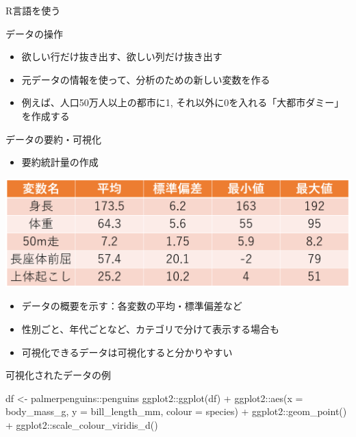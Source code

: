 \documentclass[
  ignorenonframetext,
]{beamer}
\newenvironment{Shaded}{\begin{snugshade}}{\end{snugshade}}
\newcommand{\AttributeTok}[1]{\textcolor[rgb]{0.77,0.63,0.00}{#1}}
\newcommand{\FunctionTok}[1]{\textcolor[rgb]{0.00,0.00,0.00}{#1}}
\newcommand{\NormalTok}[1]{#1}
\newcommand{\OtherTok}[1]{\textcolor[rgb]{0.56,0.35,0.01}{#1}}
\newcommand{\SpecialCharTok}[1]{\textcolor[rgb]{0.00,0.00,0.00}{#1}}
\providecommand{\tightlist}{%
  \setlength{\itemsep}{0pt}\setlength{\parskip}{0pt}}
\begin{document}
\begin{frame}[fragile]{R言語を使う}
\begin{block}{データの操作}
\begin{itemize}
  \begin{itemize}
  \tightlist
  \item
    欲しい行だけ抜き出す、欲しい列だけ抜き出す
  \item
    元データの情報を使って、分析のための新しい変数を作る
  \item
    例えば、人口50万人以上の都市に1,
    それ以外に0を入れる「大都市ダミー」を作成する
  \end{itemize}
\end{itemize}
\end{block}

\begin{block}{データの要約・可視化}
\protect\hypertarget{ux30c7ux30fcux30bfux306eux8981ux7d04ux53efux8996ux5316}{}
\begin{itemize}
\tightlist
\item
  要約統計量の作成
\end{itemize}

\begin{center}\includegraphics[width=0.8\linewidth]{figs/summary_ex} \end{center}

\begin{itemize}
\tightlist
\item
  データの概要を示す：各変数の平均・標準偏差など
\item
  性別ごと、年代ごとなど、カテゴリで分けて表示する場合も
\item
  可視化できるデータは可視化すると分かりやすい
\end{itemize}
\end{block}

\begin{block}{可視化されたデータの例}
\protect\hypertarget{ux53efux8996ux5316ux3055ux308cux305fux30c7ux30fcux30bfux306eux4f8b}{}
\begin{Shaded}
\begin{Highlighting}[]
\NormalTok{df }\OtherTok{\textless{}{-}}\NormalTok{ palmerpenguins}\SpecialCharTok{::}\NormalTok{penguins}
\NormalTok{ggplot2}\SpecialCharTok{::}\FunctionTok{ggplot}\NormalTok{(df) }\SpecialCharTok{+}
\NormalTok{  ggplot2}\SpecialCharTok{::}\FunctionTok{aes}\NormalTok{(}\AttributeTok{x =}\NormalTok{ body\_mass\_g, }\AttributeTok{y =}\NormalTok{ bill\_length\_mm, }\AttributeTok{colour =}\NormalTok{ species) }\SpecialCharTok{+}
\NormalTok{  ggplot2}\SpecialCharTok{::}\FunctionTok{geom\_point}\NormalTok{() }\SpecialCharTok{+}
\NormalTok{  ggplot2}\SpecialCharTok{::}\FunctionTok{scale\_colour\_viridis\_d}\NormalTok{()}
\end{Highlighting}
\end{Shaded}


\end{block}
\end{frame}
\end{document}
